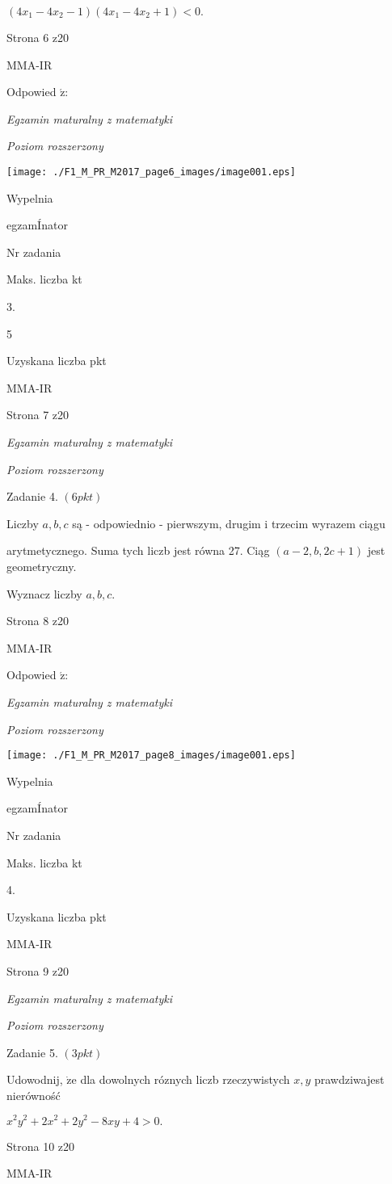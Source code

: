 \documentclass[a4paper,12pt]{article}
\begin{document}
$(4x_{1}-4x_{2}-1)(4x_{1}-4x_{2}+1)<0.$

Strona 6 z20

MMA-IR





Odpowied $\acute{\mathrm{z}}$:

{\it Egzamin maturalny z matematyki}

{\it Poziom rozszerzony}
\begin{center}
\texttt{[image: ./F1\_M\_PR\_M2017\_page6\_images/image001.eps]}
\end{center}
Wypelnia

egzamÍnator

Nr zadania

Maks. liczba kt

3.

5

Uzyskana liczba pkt

MMA-IR

Strona 7 z20





{\it Egzamin maturalny z matematyki}

{\it Poziom rozszerzony}

Zadanie 4. $(6pkt)$

Liczby $a, b, c$ są - odpowiednio - pierwszym, drugim i trzecim wyrazem ciągu

arytmetycznego. Suma tych liczb jest równa 27. Ciąg $(a-2,b,2c+1)$ jest geometryczny.

Wyznacz liczby $a, b, c.$

Strona 8 z20

MMA-IR





Odpowied $\acute{\mathrm{z}}$:

{\it Egzamin maturalny z matematyki}

{\it Poziom rozszerzony}
\begin{center}
\texttt{[image: ./F1\_M\_PR\_M2017\_page8\_images/image001.eps]}
\end{center}
Wypelnia

egzamÍnator

Nr zadania

Maks. liczba kt

4.

Uzyskana liczba pkt

MMA-IR

Strona 9 z20





{\it Egzamin maturalny z matematyki}

{\it Poziom rozszerzony}

Zadanie 5. $(3pkt)$

Udowodnij, $\dot{\mathrm{z}}\mathrm{e}$ dla dowolnych róznych liczb rzeczywistych $x, y$ prawdziwajest nierówność

$x^{2}y^{2}+2x^{2}+2y^{2}-8xy+4>0.$

Strona 10 z20

MMA-IR
\end{document}
